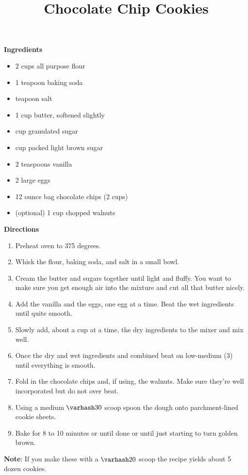 \documentclass{article}
\title{Chocolate Chip Cookies}
\begin{document}
\textbf{Ingredients}

\begin{multicols}{2}

      \begin{itemize}
            \item 2 cups all purpose flour
            \item 1 teapoon baking soda
            \item {} teapoon salt

            \item 1 cup butter, softened slightly
            \item {} cup granulated sugar
            \item {} cup packed light brown sugar

            \item 2 teaspoons vanilla
            \item 2 large eggs
            \item 12 ounce bag chocolate chips (2 cups)
            \item (optional) 1 cup chopped walnuts
      \end{itemize}
\end{multicols}

\textbf{Directions}

\begin{enumerate}
      \item Preheat oven to 375 degrees.
      \item Whisk the flour, baking soda, and salt in a small bowl.
      \item Cream the butter and sugars together until light and fluffy. You want to make sure you get
            enough air into the mixture and cut all that butter nicely.
      \item Add the vanilla and the eggs, one egg at a time. Beat the wet ingredients until quite smooth.
      \item Slowly add, about a cup at a time, the dry ingredients to the mixer and mix well.
      \item Once the dry and wet ingredients and combined beat on low-medium (3) until
            everything is smooth.
      \item Fold in the chocolate chips and, if using, the walnuts. Make sure they're well
            incorporated but do not over beat.
      \item Using a medium $\varhash 30$ scoop spoon the dough onto parchment-lined cookie sheets.
      \item Bake for 8 to 10 minutes or until done or until just starting to turn golden brown.
\end{enumerate}

\medskip

\textbf{Note}: If you make these with a $\varhash 20$ scoop the recipe yields about 5 dozen cookies.

\end{document}
